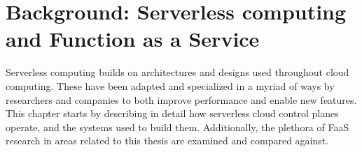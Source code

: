 \chapter{Background: Serverless computing and Function as a Service}
\label{chap:serverless}

Serverless computing builds on architectures and designs used throughout cloud computing.
These have been adapted and specialized in a myriad of ways by researchers and companies to both improve performance and enable new features.
This chapter starts by describing in detail how serverless cloud control planes operate, and the systems used to build them.
Additionally, the plethora of FaaS research in areas related to this thesis are examined and compared against.




